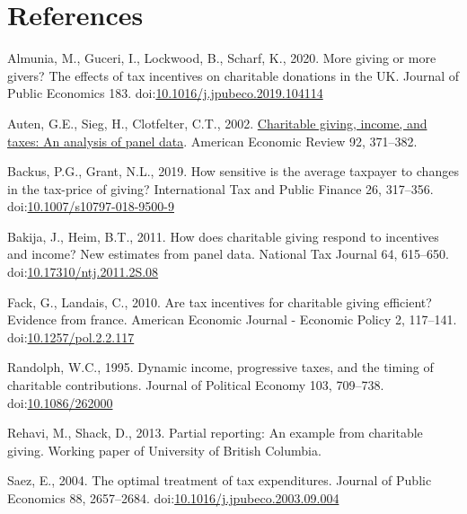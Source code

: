 \documentclass[
  11pt,
  a4paper,
]{article}
\newlength{\cslhangindent}
\newlength{\cslentryspacingunit} %
\newenvironment{CSLReferences}[2] %
 {%
  \setlength{\parindent}{0pt}
  \ifodd #1
  \let\oldpar\par
  \def\par{\hangindent=\cslhangindent\oldpar}
  \fi
  \setlength{\parskip}{#2\cslentryspacingunit}
 }%
 {}
\begin{document}
\newpage

\hypertarget{references}{%
\section*{References}\label{references}}

\hypertarget{refs_main}{}
\begin{CSLReferences}{1}{0}
\leavevmode{}%
Almunia, M., Guceri, I., Lockwood, B., Scharf, K., 2020. More giving or more givers? The effects of tax incentives on charitable donations in the UK. Journal of Public Economics 183. doi:\href{https://doi.org/10.1016/j.jpubeco.2019.104114}{10.1016/j.jpubeco.2019.104114}

\leavevmode{}%
Auten, G.E., Sieg, H., Clotfelter, C.T., 2002. \href{http://www.jstor.org/stable/3083340}{Charitable giving, income, and taxes: An analysis of panel data}. American Economic Review 92, 371--382.

\leavevmode{}%
Backus, P.G., Grant, N.L., 2019. How sensitive is the average taxpayer to changes in the tax-price of giving? International Tax and Public Finance 26, 317--356. doi:\href{https://doi.org/10.1007/s10797-018-9500-9}{10.1007/s10797-018-9500-9}

\leavevmode{}%
Bakija, J., Heim, B.T., 2011. How does charitable giving respond to incentives and income? New estimates from panel data. National Tax Journal 64, 615--650. doi:\href{https://doi.org/10.17310/ntj.2011.2S.08}{10.17310/ntj.2011.2S.08}

\leavevmode{}%
Fack, G., Landais, C., 2010. Are tax incentives for charitable giving efficient? Evidence from france. American Economic Journal - Economic Policy 2, 117--141. doi:\href{https://doi.org/10.1257/pol.2.2.117}{10.1257/pol.2.2.117}

\leavevmode{}%
Randolph, W.C., 1995. Dynamic income, progressive taxes, and the timing of charitable contributions. Journal of Political Economy 103, 709--738. doi:\href{https://doi.org/10.1086/262000}{10.1086/262000}

\leavevmode{}%
Rehavi, M., Shack, D., 2013. Partial reporting: An example from charitable giving. Working paper of University of British Columbia.

\leavevmode{}%
Saez, E., 2004. The optimal treatment of tax expenditures. Journal of Public Economics 88, 2657--2684. doi:\href{https://doi.org/10.1016/j.jpubeco.2003.09.004}{10.1016/j.jpubeco.2003.09.004}

\end{CSLReferences}
\end{document}
